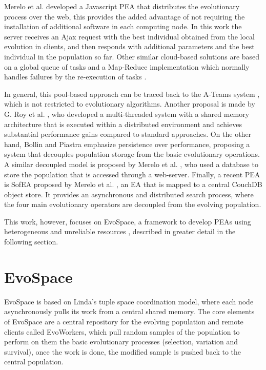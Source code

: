 \documentclass{sig-alternate}
\begin{document}
Merelo et al. \cite{JSON} developed a Javascript PEA that distributes the evolutionary process over the web,
this provides the added advantage of not requiring the installation of additional software in each computing node. 
In this work the server receives an Ajax request with the best individual 
obtained from the local evolution in clients, and then responds with 
additional parameters and the best individual in the population so far. 
Other similar cloud-based solutions are based on a global queue of tasks and a Map-Reduce 
implementation which normally handles failures by the re-execution of  tasks \cite{fazenda2012,di2013towards,FlexGP}. 



In general, this pool-based approach can be traced back to the A-Teams system \cite{ateam}, which is not restricted to evolutionary algorithms.
Another proposal is made by G. Roy et al. \cite{roy:2009}, who developed a multi-threaded system with a shared memory architecture that is
executed within a distributed environment and achieves substantial performance gains compared to standard approaches. On the other hand, Bollin and Piastra \cite{bollini:1999} emphasize persistence over performance, proposing a system that decouples population storage from the basic evolutionary operations. A similar decoupled model is proposed by Merelo et al. \cite{merelo:2008}, who used a database to store the population that is accessed through a web-server. Finally, a recent PEA is SofEA proposed by Merelo et al. \cite{sofea1,sofea2},
an EA that is mapped to a central CouchDB object store. It provides an asynchronous and distributed search process, where the four main evolutionary operators are decoupled from the evolving population.

This work, however, focuses on EvoSpace, a framework to develop PEAs using heterogeneous and unreliable resources \cite{Evospace,Musart,FreeLunch,Fire}, described in greater
detail in the following section.
 
\section{EvoSpace}
\label{sec:evo}
EvoSpace is based on Linda's tuple space \cite{Evospace} coordination model, where each node asynchronously
pulls its work from a central shared memory. The core elements of EvoSpace are a central 
repository for the evolving population and remote clients called EvoWorkers,
which pull random samples of the population to perform on them the basic evolutionary
processes (selection, variation and survival), once the work is done, the modified sample is pushed back to the central population.
\end{document}
